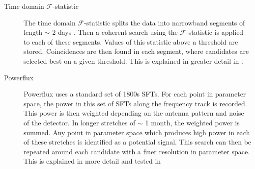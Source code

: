 \begin{description}
	\item[Time domain $\mathcal{F}$-statistic] The time domain $\mathcal{F}$-statistic splits the data into narrowband segments of length $\sim$ 2 days \citep{walsh2016ComparisonMethods}. Then a coherent search using the $\mathcal{F}$-statistic is applied to each of these segments. Values of this statistic above a threshold are stored. Coincidences are then found in each segment, where candidates are selected best on a given threshold. This is explained in greater detail in \citep{aasi2014ImplementationTextdollar,walsh2016ComparisonMethods}.
	
	
	\item[Powerflux] Powerflux uses a standard set of 1800s \acp{SFT}. For each point in parameter space, the power in this set of \acp{SFT} along the frequency track is recorded. This power is then weighted depending on the antenna pattern and noise of the detector. In longer stretches of $\sim$ 1 month, the weighted power is summed. Any point in parameter space which produces high power in each of these stretches is identified as a potential signal. This search can then be repeated around each candidate with a finer resolution in parameter space. This is explained in more detail and tested in \citep{abadie2012AllskySearch,walsh2016ComparisonMethods,ligoscientificcollaborationandvirgocollaboration2016ComprehensiveAllsky}
	
	
\end{description}


